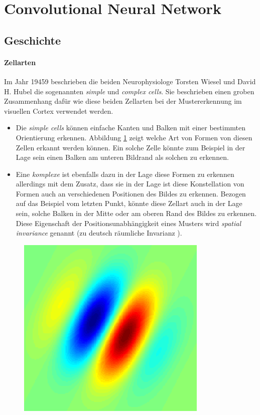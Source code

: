 \section{Convolutional Neural Network}

\subsection{Geschichte}

\paragraph{Zellarten} 
Im Jahr 19459 beschrieben die beiden Neurophysiologe Torsten Wiesel und David H. Hubel die sogenannten \emph{simple} und \emph{complex cells}. Sie beschrieben einen groben Zusammenhang dafür wie diese beiden Zellarten bei der Mustererkennung im visuellen Cortex verwendet werden. 

\begin{itemize}
\item Die \emph{simple cells} können einfache Kanten und Balken mit einer bestimmten Orientierung erkennen. Abbildung \ref{fig:gabor_filter} zeigt welche Art von Formen von diesen Zellen erkannt werden können. Ein solche Zelle könnte zum Beispiel in der Lage sein einen Balken am unteren Bildrand als solchen zu erkennen. 

\item Eine \emph{komplexe} ist ebenfalls dazu in der Lage diese Formen zu erkennen allerdings mit dem Zusatz, dass sie in der Lage ist diese Konstellation von Formen auch an verschiedenen Positionen des Bildes zu erkennen. Bezogen auf das Beispiel vom letzten Punkt, könnte diese Zellart auch in der Lage sein, solche Balken in der Mitte oder am oberen Rand des Bildes zu erkennen. Diese Eigenschaft der Positionsunabhängigkeit eines Musters wird \emph{spatial invariance} genannt (zu deutsch \glqq räumliche Invarianz \grqq ).
\end{itemize}

\begin{figure}[!htb]
	\centering
	\includegraphics[width=.5\linewidth]{img/gabor_filter}
	\label{fig:gabor_filter}
\end{figure}

